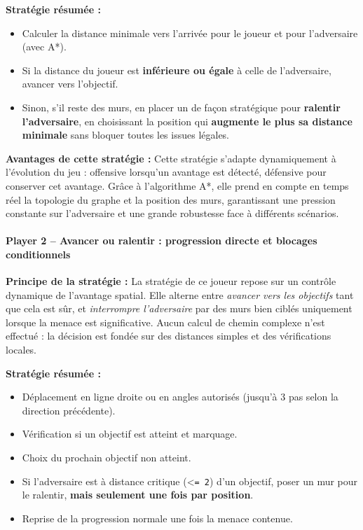 \vspace{0.3cm}

\noindent\textbf{Stratégie résumée :}
\begin{itemize}
  \item Calculer la distance minimale vers l’arrivée pour le joueur et pour l’adversaire (avec A*).
  \item Si la distance du joueur est \textbf{inférieure ou égale} à celle de l’adversaire, avancer vers l’objectif.
  \item Sinon, s’il reste des murs, en placer un de façon stratégique pour \textbf{ralentir l’adversaire}, en choisissant la position qui \textbf{augmente le plus sa distance minimale} sans bloquer toutes les issues légales.
\end{itemize}

\vspace{0.3cm}

\noindent\textbf{Avantages de cette stratégie :} Cette stratégie s’adapte dynamiquement à l’évolution du jeu : offensive lorsqu’un avantage est détecté, défensive pour conserver cet avantage. Grâce à l’algorithme A*, elle prend en compte en temps réel la topologie du graphe et la position des murs, garantissant une pression constante sur l’adversaire et une grande robustesse face à différents scénarios.

\paragraph{Player 2 – Avancer ou ralentir : progression directe et blocages conditionnels}

\noindent
\textbf{Principe de la stratégie :} La stratégie de ce joueur repose sur un contrôle dynamique de l'avantage spatial. Elle alterne entre \textit{avancer vers les objectifs} tant que cela est sûr, et \textit{interrompre l'adversaire} par des murs bien ciblés uniquement lorsque la menace est significative. Aucun calcul de chemin complexe n'est effectué : la décision est fondée sur des distances simples et des vérifications locales.

\vspace{0.3cm}

\noindent\textbf{Stratégie résumée :}
\begin{itemize}
\item Déplacement en ligne droite ou en angles autorisés (jusqu'à 3 pas selon la direction précédente).
\item Vérification si un objectif est atteint et marquage.
\item Choix du prochain objectif non atteint.
\item Si l'adversaire est à distance critique (<\texttt{= 2}) d'un objectif, poser un mur pour le ralentir, \textbf{mais seulement une fois par position}.
\item Reprise de la progression normale une fois la menace contenue.
\end{itemize}

